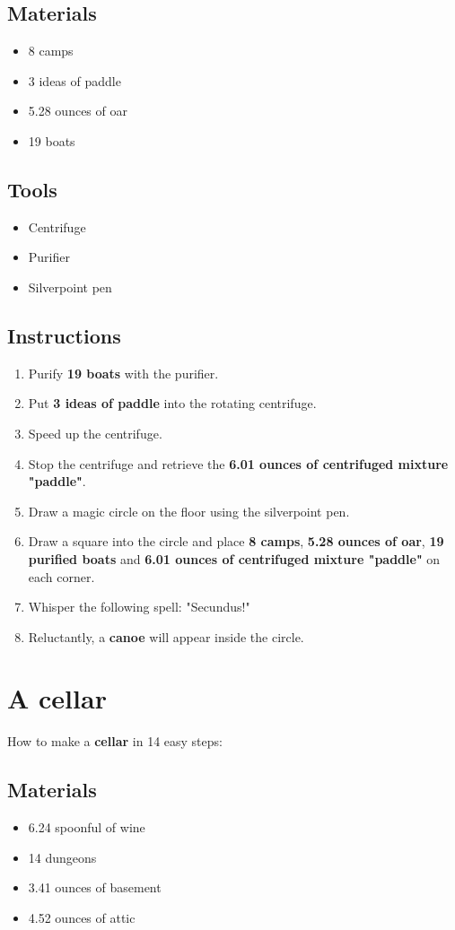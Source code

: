 \documentclass{article}
\begin{document}
\subsection{Materials}\begin{itemize}
\item 
8 camps
\item 
3 ideas of paddle
\item 
5.28 ounces of oar
\item 
19 boats
\end{itemize}
\subsection{Tools}\begin{itemize}
\item 
Centrifuge
\item 
Purifier
\item 
Silverpoint pen
\end{itemize}
\subsection{Instructions}\begin{enumerate}
\item 
Purify \textbf{19 boats} with the purifier.
\item 
Put \textbf{3 ideas of paddle} into the rotating centrifuge.
\item 
Speed up the centrifuge.
\item 
Stop the centrifuge and retrieve the \textbf{6.01 ounces of centrifuged mixture "paddle"}.
\item 
Draw a magic circle on the floor using the silverpoint pen.
\item 
Draw a square into the circle and place \textbf{8 camps}, \textbf{5.28 ounces of oar}, \textbf{19 purified boats} and \textbf{6.01 ounces of centrifuged mixture "paddle"} on each corner.
\item 
Whisper the following spell: "Secundus!"
\item 
Reluctantly, a \textbf{canoe} will appear inside the circle.
\end{enumerate}
\newpage
\section{A cellar}How to make a \textbf{cellar} in 14 easy steps:

\subsection{Materials}\begin{itemize}
\item 
6.24 spoonful of wine
\item 
14 dungeons
\item 
3.41 ounces of basement
\item 
4.52 ounces of attic
\end{itemize}
\end{document}

